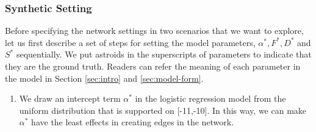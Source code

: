 \documentclass[AMS,STIX1COL]{WileyNJD-v2}
\begin{document}
{\subsubsection{Synthetic Setting} \label{sec:Syn-set}
Before specifying the network settings in two scenarios that we want to explore, let us first describe a set of steps for setting the model parameters, $\alpha^*, F^*, D^*$ and $S^*$ sequentially.
We put astroids in the superscripts of parameters to indicate that they are the ground truth.
Readers can refer the meaning of each parameter in the model in Section \ref{sec:intro} and  \ref{sec:model-form}.

\begin{enumerate}
    \item We draw an intercept term $\alpha^*$ in the logistic regression model from the uniform distribution that is supported on [-11,-10].
        In this way, we can make $\alpha^*$ have the least effects in creating edges in the network.


\end{enumerate}}
\end{document}
